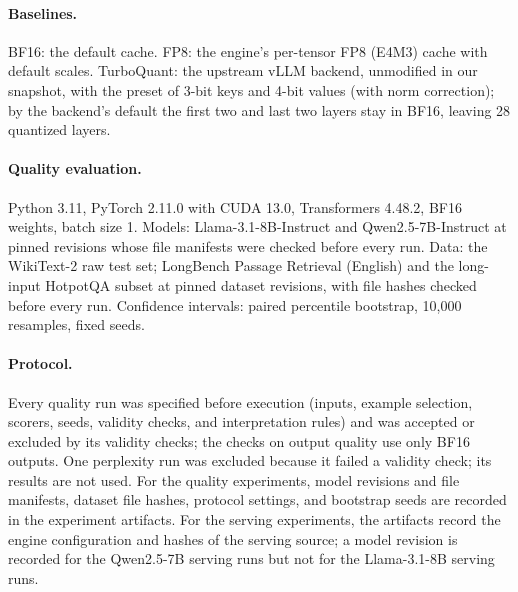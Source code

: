 \documentclass{article}
\begin{document}
\paragraph{Baselines.}
BF16: the default cache. FP8: the engine's per-tensor FP8 (E4M3) cache with default scales.
TurboQuant: the upstream vLLM backend, unmodified in our snapshot, with the preset of 3-bit keys and
4-bit values (with norm correction); by the backend's default the first two and last two layers stay
in BF16, leaving 28 quantized layers.

\paragraph{Quality evaluation.}
Python 3.11, PyTorch 2.11.0 with CUDA 13.0, Transformers 4.48.2, BF16 weights, batch size 1.
Models: Llama-3.1-8B-Instruct and Qwen2.5-7B-Instruct at pinned revisions whose file manifests were
checked before every run. Data: the WikiText-2 raw test set; LongBench Passage Retrieval (English) and
the long-input HotpotQA subset at pinned dataset revisions, with file hashes checked before every run.
Confidence intervals: paired percentile bootstrap, 10,000 resamples, fixed seeds.

\paragraph{Protocol.}
Every quality run was specified before execution (inputs, example selection, scorers, seeds, validity
checks, and interpretation rules) and was accepted or excluded by its validity checks; the checks on
output quality use only BF16 outputs. One perplexity run was excluded because it failed a validity
check; its results are not used. For the quality experiments, model revisions and file manifests,
dataset file hashes, protocol settings, and bootstrap seeds are recorded in the experiment artifacts.
For the serving experiments, the artifacts record the engine configuration and hashes of the serving
source; a model revision is recorded for the Qwen2.5-7B serving runs but not for the Llama-3.1-8B
serving runs.
\end{document}
